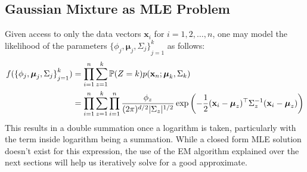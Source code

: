 \subsection{Gaussian Mixture as MLE Problem}
Given access to only the data vectors $\textbf{x}_i$ for $i=1,2,\dots,n$, one may model the likelihood of the parameters ${\{\phi_j,\boldsymbol{\mu}_j,\Sigma_j\}}_{j=1}^k$ as follows:
\begin{align*}
    f({\{\phi_j,\boldsymbol{\mu}_j,\Sigma_j\}}_{j=1}^k) 
    &= \prod_{i=1}^n \sum_{z=1}^k \mathbb{P}(Z=k)p(\mathbf{x}_n;\boldsymbol{\mu}_k,\Sigma_k) \\
    &= \prod_{i=1}^n \sum_{z=1}^k \prod_{i=1}^n \frac{\phi_z}{(2\pi)^{d/2}|\Sigma_z|^{1/2}} \exp\left( -\frac{1}{2} (\mathbf{x}_i - \boldsymbol{\mu}_z)^\top \Sigma_z^{-1} (\mathbf{x}_i - \boldsymbol{\mu}_z) \right)
\end{align*}
This results in a double summation once a logarithm is taken, particularly with the term inside logarithm being a summation. While a closed form MLE solution doesn't exist for this expression, the use of the EM algorithm explained over the next sections will help us iteratively solve for a good approximate.
